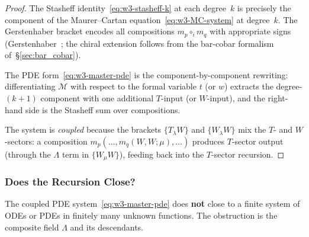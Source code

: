 \begin{proof}
The Stasheff identity~\eqref{eq:w3-stasheff-k} at each degree~$k$ is
precisely the component of the Maurer--Cartan
equation~\eqref{eq:w3-MC-system} at degree~$k$. The Gerstenhaber
bracket encodes all compositions $m_p \circ_i m_q$ with appropriate
signs (Gerstenhaber~\cite{Ger63}; the chiral extension follows from
the bar-cobar formalism of~\S\ref{sec:bar_cobar}).

The PDE form~\eqref{eq:w3-master-pde} is the component-by-component
rewriting: differentiating $\mathcal{M}$ with respect to the formal
variable $t$ (or $w$) extracts the degree-$(k+1)$ component with one
additional $T$-input (or $W$-input), and the right-hand side is the
Stasheff sum over compositions.

The system is \emph{coupled} because the brackets $\{T_\lambda W\}$
and $\{W_\lambda W\}$ mix the $T$- and $W$-sectors: a composition
$m_p(\ldots, m_q(W,W;\mu), \ldots)$ produces $T$-sector output
(through the $\Lambda$ term in $\{W_\mu W\}$), feeding back into the
$T$-sector recursion.
\end{proof}

\subsubsection{Does the Recursion Close?}

\begin{theorem}
\label{thm:w3-non-closure}
The coupled PDE system~\eqref{eq:w3-master-pde} does \textbf{not}
close to a finite system of ODEs or PDEs in finitely many unknown
functions. The obstruction is the composite field $\Lambda$ and its
descendants.
\end{theorem}

